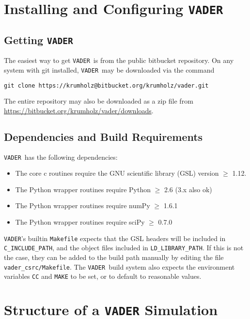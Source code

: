\documentclass[12pt]{article}
\newcommand{\vader}{\texttt{VADER}}
\begin{document}
\section{Installing and Configuring \vader}

\subsection{Getting \vader}

The easiest way to get \vader\ is from the public bitbucket repository. On any system with git installed, \vader\ may be downloaded via the command
\begin{verbatim}
git clone https://krumholz@bitbucket.org/krumholz/vader.git
\end{verbatim}
The entire repository may also be downloaded as a zip file from \url{https://bitbucket.org/krumholz/vader/downloads}.

\subsection{Dependencies and Build Requirements}

\vader\ has the following dependencies:
\begin{itemize}
\item The core c routines require the GNU scientific library (GSL) version $\geq$ 1.12.
\item The Python wrapper routines require Python $\geq$ 2.6 (3.x also ok)
\item The Python wrapper routines require numPy $\geq$ 1.6.1
\item The Python wrapper routines require sciPy $\geq$ 0.7.0
\end{itemize}
\vader's builtin \verb=Makefile= expects that the GSL headers will be included in \verb=C_INCLUDE_PATH=, and the object files included in \verb=LD_LIBRARY_PATH=. If this is not the case, they can be added to the build path manually by editing the file \verb=vader_csrc/Makefile=. The \vader\ build system also expects the environment variables \verb=CC= and \verb=MAKE= to be set, or to default to reasonable values.


\section{Structure of a \texttt{VADER} Simulation}
\label{sec:simstruct}
\end{document}

